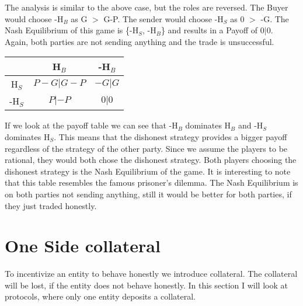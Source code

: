 \documentclass{cacthesis}
\begin{document}
\newline
The analysis is similar to the above case, but the roles are reversed. The Buyer would choose -H$_B$ as G $>$ G-P.\newline
The sender would choose -H$_S$ as 0 $>$ -G.\newline
The Nash Equilibrium of this game is \{-H$_S$, -H$_B$\} and results in a Payoff of $0|0$. Again, both parties are not sending anything and the trade is unsuccessful.


\begin{center}
\begin{tabular}{ c||c|c| }
& H$_B$ & -H$_B$  \\
\hline
\hline
H$_S$ & $P - G|G - P$ & $-G | G$ \\
\hline
-H$_S$ & $P |-P$ & $0 | 0$ \\ 
\hline
\end{tabular}
\end{center}

If we look at the payoff table we can see that -H$_B$ dominates H$_B$ and -H$_S$ dominates H$_S$. This means that the dishonest strategy provides a bigger payoff regardless of the strategy of the other party. \newline
Since we assume the players to be rational, they would both chose the dishonest strategy. Both players choosing the dishonest strategy is the Nash Equilibrium of the game.\newline
It is interesting to note that this table resembles the famous prisoner's dilemma.
The Nash Equilibrium is on both parties not sending anything, still it would be better for both parties, if they just traded honestly. 

\section{One Side collateral}
To incentivize an entity to behave honestly we introduce collateral. The collateral will be lost, if the entity does not behave honestly. In this section I will look at protocols, where only one entity deposits a collateral.
\end{document}
